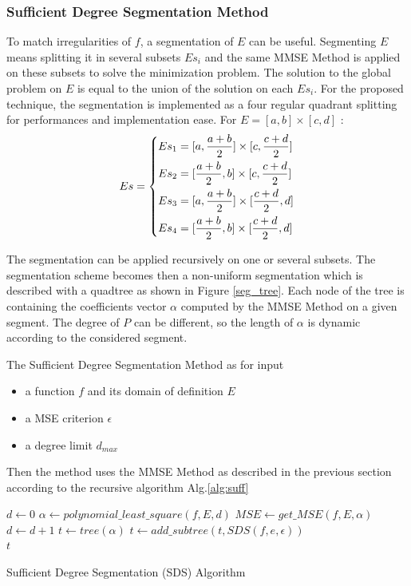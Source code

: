 \documentclass[fleqn,10pt]{SelfArx} %
\begin{document}
\subsubsection{Sufficient Degree Segmentation Method}
To match irregularities of $f$, a segmentation of $E$ can be useful. Segmenting $E$ means splitting it in several subsets $Es_i$ and the same MMSE Method is applied on these subsets to solve the minimization problem. The solution to the global problem on $E$ is equal to the union of the solution on each $Es_i$.
For the proposed technique, the segmentation is implemented as a four regular quadrant splitting for performances and implementation ease. For $E = [a, b]\times [c, d]$ : 
\begin{equation}
 Es = \begin{dcases*}
        Es_1 = [a, \frac{a+b}{2}] \times [c, \frac{c+d}{2}]\\
		Es_2 = [\frac{a+b}{2}, b] \times [c, \frac{c+d}{2}]\\
		Es_3 = [a, \frac{a+b}{2}] \times [\frac{c+d}{2}, d]\\
		Es_4 = [\frac{a+b}{2}, b] \times [\frac{c+d}{2}, d]
        \end{dcases*}
        \label{subE}
\end{equation}

The segmentation can be applied recursively on one or several subsets. The segmentation scheme becomes then a non-uniform segmentation which is described with a quadtree as shown in Figure \ref{seg_tree}.
Each node of the tree is containing the coefficients vector $\alpha$ computed by the MMSE Method on a given segment. The degree of $P$ can be different, so the length of $\alpha$ is dynamic according to the considered segment.


The Sufficient Degree Segmentation Method as for input 
\begin{itemize}
    \item a function $f$ and its domain of definition $E$
    \item a MSE criterion $\epsilon$
    \item a degree limit $d_{max}$
\end{itemize}

Then the method uses the MMSE Method as described in the previous section according to the recursive algorithm Alg.\ref{alg:suff}
\begin{algorithm}
\begin{algorithmic}[1]
\State $d \gets 0$
\Do
	\State $\alpha \gets polynomial\_least\_square(f, E, d)$ 
	\State $MSE \gets get\_MSE(f, E, \alpha)$
    \State $d \gets d+1$
\State $t \gets tree(\alpha)$
		\State $t \gets add\_subtree(t, SDS(f, e, \epsilon))$
	\EndFor
\EndIf \\
\Return $t$
\EndFunction
\end{algorithmic}
\caption{Sufficient Degree Segmentation (SDS) Algorithm}
\label{alg:suff}
\end{algorithm}
\end{document}
